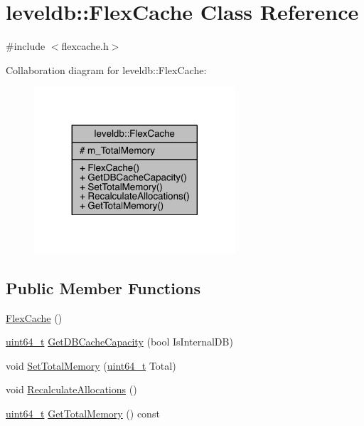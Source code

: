 \hypertarget{classleveldb_1_1_flex_cache}{}\section{leveldb\+:\+:Flex\+Cache Class Reference}
\label{classleveldb_1_1_flex_cache}


{\ttfamily \#include $<$flexcache.\+h$>$}



Collaboration diagram for leveldb\+:\+:Flex\+Cache\+:\nopagebreak
\begin{figure}[H]
\begin{center}
\leavevmode
\includegraphics[width=212pt]{classleveldb_1_1_flex_cache__coll__graph}
\end{center}
\end{figure}
\subsection*{Public Member Functions}
\begin{DoxyCompactItemize}
\item 
\hyperlink{classleveldb_1_1_flex_cache_a79b713f2185b2ff2dc68f677331efd50}{Flex\+Cache} ()
\item 
\hyperlink{stdint_8h_aaa5d1cd013383c889537491c3cfd9aad}{uint64\+\_\+t} \hyperlink{classleveldb_1_1_flex_cache_a093372082dcb96d2568fa9899cae92b1}{Get\+D\+B\+Cache\+Capacity} (bool Is\+Internal\+D\+B)
\item 
void \hyperlink{classleveldb_1_1_flex_cache_a4863498e73e13779c6dc5fadb519b067}{Set\+Total\+Memory} (\hyperlink{stdint_8h_aaa5d1cd013383c889537491c3cfd9aad}{uint64\+\_\+t} Total)
\item 
void \hyperlink{classleveldb_1_1_flex_cache_ab867dd878b70d9e9694eb57ddd137327}{Recalculate\+Allocations} ()
\item 
\hyperlink{stdint_8h_aaa5d1cd013383c889537491c3cfd9aad}{uint64\+\_\+t} \hyperlink{classleveldb_1_1_flex_cache_a9bbcdcde3c9b1247bc6f4ccd0d748928}{Get\+Total\+Memory} () const 
\end{DoxyCompactItemize}

